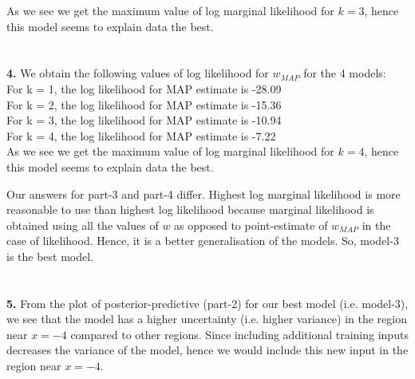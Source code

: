 \documentclass[a4paper,11pt]{article}
\begin{document}
\begin{pmisolution}
As we see we get the maximum value of log marginal likelihood for $k=3$, hence this model seems to explain data the best.
\\ \\ \\
\textbf{4.} 
We obtain the following values of log likelihood for $w_{MAP}$ for the 4 models: \\
For k = 1, the log likelihood for MAP estimate is -28.09 \\
For k = 2, the log likelihood for MAP estimate is -15.36 \\
For k = 3, the log likelihood for MAP estimate is -10.94 \\
For k = 4, the log likelihood for MAP estimate is -7.22 \\

As we see we get the maximum value of log marginal likelihood for $k=4$, hence this model seems to explain data the best.

Our answers for part-3 and part-4 differ. Highest log marginal likelihood is more reasonable to use than highest log likelihood because marginal likelihood is obtained using all the values of $w$ as opposed to point-estimate of $w_{MAP}$ in the case of likelihood. Hence, it is a better generalisation of the models. So, model-3 is the best model.
\\ \\ \\
\textbf{5.} From the  plot of posterior-predictive (part-2) for our best model (i.e. model-3), we see that the model has a higher uncertainty (i.e. higher variance) in the region near $x=-4$ compared to other regions. Since including additional training inputs decreases the variance of the model, hence we would include this new input in the region near $x=-4$.

\end{pmisolution}
\end{document}
